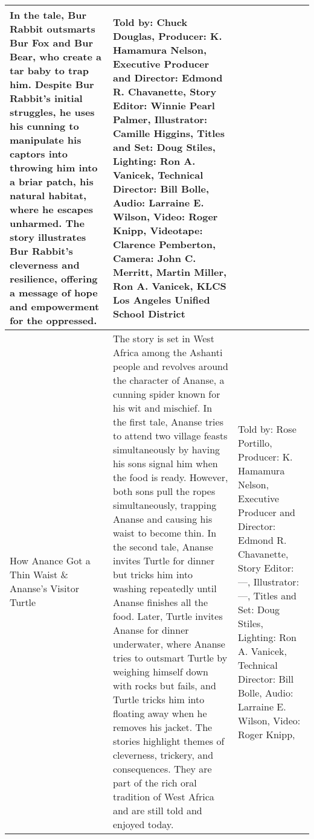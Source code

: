 \begin{table}[h]
\begin{small}
\begin{tabular}{|p{1.5cm}|p{8.5cm}|p{7cm}|}
            In the tale, Bur Rabbit outsmarts Bur Fox and Bur Bear, who create a tar baby to trap him.
            Despite Bur Rabbit's initial struggles, he uses his cunning to manipulate his captors into throwing him into a briar patch, his natural habitat, where he escapes unharmed.
            The story illustrates Bur Rabbit's cleverness and resilience, offering a message of hope and empowerment for the oppressed.
                                 &
            Told by: Chuck Douglas,
            Producer: K. Hamamura Nelson,
            Executive Producer and Director: Edmond R. Chavanette,
            Story Editor: Winnie Pearl Palmer,
            Illustrator: Camille Higgins,
            Titles and Set: Doug Stiles,
            Lighting: Ron A. Vanicek,
            Technical Director: Bill Bolle,
            Audio: Larraine E. Wilson,
            Video: Roger Knipp,
            Videotape: Clarence Pemberton,
            Camera: John C. Merritt, Martin Miller, Ron A. Vanicek,
            KLCS Los Angeles Unified School District
            \\
            \hline
            How Anance Got a Thin Waist \& Ananse's Visitor Turtle
                                 &
            The story is set in West Africa among the Ashanti people and revolves around the character of Ananse, a cunning spider known for his wit and mischief.
            In the first tale, Ananse tries to attend two village feasts simultaneously by having his sons signal him when the food is ready.
            However, both sons pull the ropes simultaneously, trapping Ananse and causing his waist to become thin.
            In the second tale, Ananse invites Turtle for dinner but tricks him into washing repeatedly until Ananse finishes all the food.
            Later, Turtle invites Ananse for dinner underwater, where Ananse tries to outsmart Turtle by weighing himself down with rocks but fails, and Turtle tricks him into floating away when he removes his jacket.
            The stories highlight themes of cleverness, trickery, and consequences.
            They are part of the rich oral tradition of West Africa and are still told and enjoyed today.
                                 &
            Told by: Rose Portillo,
            Producer: K. Hamamura Nelson,
            Executive Producer and Director: Edmond R. Chavanette,
            Story Editor: ---,
            Illustrator: ---,
            Titles and Set: Doug Stiles,
            Lighting: Ron A. Vanicek,
            Technical Director: Bill Bolle,
            Audio: Larraine E. Wilson,
            Video: Roger Knipp,

\end{tabular}
\end{small}
\end{table}
